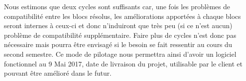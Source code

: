 Nous estimons que deux cycles sont suffisants car, une fois les problèmes de compatibilité entre les blocs résolus, les améliorations apportées à chaque blocs seront internes à ceux-ci et donc n’induiront que très peu (si ce n’est aucun) problème de compatibilité supplémentaire. Faire plus de cycles n’est donc pas nécessaire mais pourra être envisagé si le besoin se fait ressentir au cours du second semestre. Ce mode de pilotage nous permettra ainsi d’avoir un logiciel fonctionnel au 9 Mai 2017, date de livraison du projet, utilisable par le client et pouvant être amélioré dans le futur.















